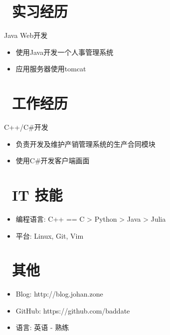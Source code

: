 \documentclass{resume}
\begin{document}
\section{\faUsers\ 实习经历}
\begin{onehalfspacing}
Java Web开发
\begin{itemize}
  \item 使用Java开发一个人事管理系统
  \item 应用服务器使用tomcat
\end{itemize}
\end{onehalfspacing}

\section{\faUsers\ 工作经历}
\begin{onehalfspacing}
C++/C\#开发
\begin{itemize}
  \item 负责开发及维护产销管理系统的生产合同模块
  \item 使用C\#开发客户端画面
\end{itemize}
\end{onehalfspacing}


\section{\faCogs\ IT 技能}
\begin{itemize}[parsep=0.5ex]
  \item 编程语言: C++ == C > Python > Java > Julia
  \item 平台: Linux, Git, Vim
\end{itemize}


\section{\faInfo\ 其他}
\begin{itemize}[parsep=0.5ex]
  \item Blog: http://blog.johan.zone
  \item GitHub: https://github.com/baddate
  \item 语言: 英语 - 熟练
\end{itemize}

%
%
\end{document}
